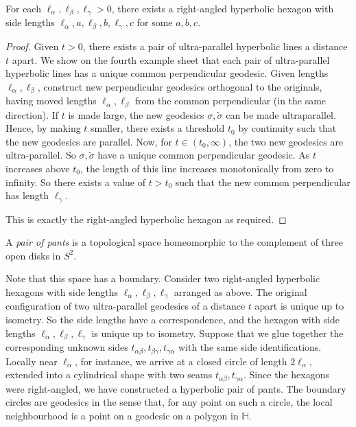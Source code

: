 \begin{lemma}
	For each \( \ell_\alpha, \ell_\beta, \ell_\gamma > 0 \), there exists a right-angled hyperbolic hexagon with side lengths \( \ell_\alpha, a, \ell_\beta, b, \ell_\gamma, c \) for some \( a,b,c \).
\end{lemma}
\begin{proof}
	Given \( t > 0 \), there exists a pair of ultra-parallel hyperbolic lines a distance \( t \) apart.
	We show on the fourth example sheet that each pair of ultra-parallel hyperbolic lines has a unique common perpendicular geodesic.
	Given lengths \( \ell_\alpha, \ell_\beta \), construct new perpendicular geodesics orthogonal to the originals, having moved lengths \( \ell_\alpha, \ell_\beta \) from the common perpendicular (in the same direction).
	If \( t \) is made large, the new geodesics \( \sigma, \widetilde \sigma \) can be made ultraparallel.
	Hence, by making \( t \) smaller, there exists a threshold \( t_0 \) by continuity such that the new geodesics are parallel.
	Now, for \( t \in (t_0,\infty) \), the two new geodesics are ultra-parallel.
	So \( \sigma, \widetilde \sigma \) have a unique common perpendicular geodesic.
	As \( t \) increases above \( t_0 \), the length of this line increases monotonically from zero to infinity.
	So there exists a value of \( t > t_0 \) such that the new common perpendicular has length \( \ell_\gamma \).
	\begin{center}
	\end{center}
	This is exactly the right-angled hyperbolic hexagon as required.
\end{proof}
\begin{definition}
	A \textit{pair of pants} is a topological space homeomorphic to the complement of three open disks in \( S^2 \).
\end{definition}
Note that this space has a boundary.
Consider two right-angled hyperbolic hexagons with side lengths \( \ell_\alpha, \ell_\beta, \ell_\gamma \) arranged as above.
The original configuration of two ultra-parallel geodesics of a distance \( t \) apart is unique up to isometry.
So the side lengths have a correspondence, and the hexagon with side lengths \( \ell_\alpha, \ell_\beta, \ell_\gamma \) is unique up to isometry.
Suppose that we glue together the corresponding unknown sides \( t_{\alpha\beta}, t_{\beta\gamma}, t_{\gamma\alpha} \) with the same side identifications.
Locally near \( \ell_\alpha \), for instance, we arrive at a closed circle of length \( 2\ell_\alpha \), extended into a cylindrical shape with two seams \( t_{\alpha\beta}, t_{\gamma\alpha} \).
Since the hexagons were right-angled, we have constructed a hyperbolic pair of pants.
The boundary circles are geodesics in the sense that, for any point on such a circle, the local neighbourhood is a point on a geodesic on a polygon in \( \mathbb H \).

